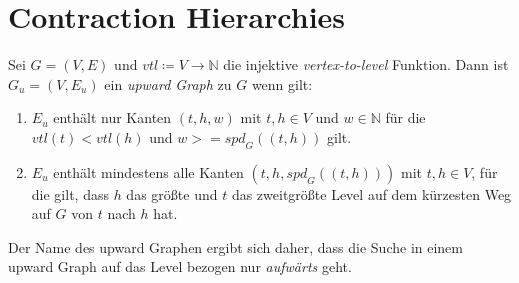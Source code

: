 \chapter{Contraction Hierarchies}\label{chapter:ch}


\begin{definition}
    Sei $G = (V, E)$ und ${vtl} \coloneq V \to \mathbb{N}$ die injektive \emph{vertex-to-level} Funktion. Dann ist $G_u = (V, E_u)$ ein \emph{upward Graph} zu $G$ wenn gilt:
    \begin{enumerate}
        \item\label{ch:definition:legal_edges}
        $E_u$ enthält nur Kanten $(t, h, w)$ mit $t, h \in V$ und $w \in \mathbb{N}$ für die ${vtl}(t) < {vtl}(h)$ und $w >= {spd}_{G}((t, h))$ gilt.

        \item\label{ch:definition:upward}
        $E_u$ enthält mindestens alle Kanten $(t, h, {spd}_{G}((t, h)))$ mit $t, h \in V$, für die gilt, dass $h$ das größte und $t$ das zweitgrößte Level auf dem kürzesten Weg auf $G$ von $t$ nach $h$ hat.
    \end{enumerate}
\end{definition}

Der Name des upward Graphen ergibt sich daher, dass die Suche in einem upward Graph auf das Level bezogen nur \emph{aufwärts} geht.

